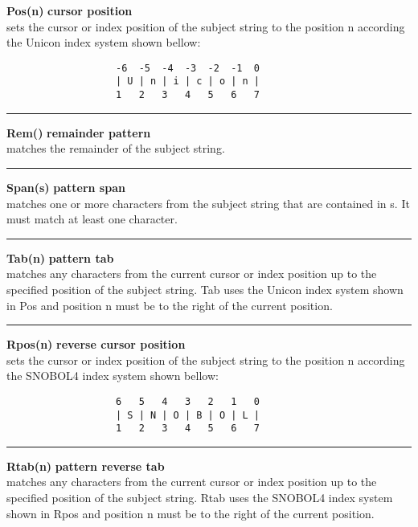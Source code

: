 \documentclass{article}
\begin{document}
\noindent\textbf{Pos(n)} \hfill\textbf{cursor position}\\
sets the cursor or index position of the subject string to the position n according the Unicon index system shown bellow:
\begin{verbatim}
                   -6  -5  -4  -3  -2  -1  0
                   | U | n | i | c | o | n |
                   1   2   3   4   5   6   7
\end{verbatim}
\noindent\rule{14cm}{0.1pt}

\noindent\textbf{Rem()} \hfill\textbf{remainder pattern}\\
matches the remainder of the subject string.\\
\noindent\rule{14cm}{0.1pt}

\noindent\textbf{Span(s)} \hfill\textbf{pattern span}\\
matches one or more characters from the subject string that are contained in s.  It must match at least one character.\\
\noindent\rule{14cm}{0.1pt}

\noindent\textbf{Tab(n)} \hfill\textbf{pattern tab}\\
matches any characters from the current cursor or index position up to the specified position of the subject string. Tab uses the Unicon index system shown in Pos and position n must be to the right of the current position.\\
\noindent\rule{14cm}{0.1pt}

\noindent\textbf{Rpos(n)} \hfill\textbf{reverse cursor position}\\
sets the cursor or index position of the subject string to the position n according the SNOBOL4 index system shown bellow:
\begin{verbatim}
                   6   5   4   3   2   1   0
                   | S | N | O | B | O | L |
                   1   2   3   4   5   6   7
\end{verbatim}
\noindent\rule{14cm}{0.1pt}

\noindent\textbf{Rtab(n)} \hfill\textbf{pattern reverse tab}\\
matches any characters from the current cursor or index position up to the specified position of the subject string. Rtab uses the SNOBOL4 index system shown in Rpos and position n must be to the right of the current position.\\


\newpage


\end{document}
